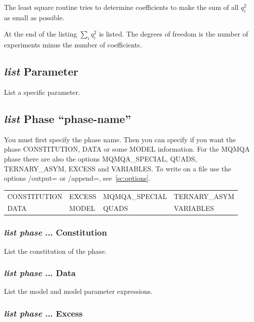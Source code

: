 \documentclass[11pt]{article}
\begin{document}
The least square routine tries to determine coefficients to make the
sum of all $q_i^2$ as small as possible.

At the end of the listing $\sum_i q_i^2$ is listed.  The degrees of
freedom is the number of experiments minus the number of coefficients.

\hypertarget{List parameter}{}
\subsection{{\em list} Parameter}

List a specific parameter.

\hypertarget{List phase}{}
\hypertarget{List what for}{}
\subsection{{\em list} Phase ``phase-name''}

You must first specify the phase name.  Then you can specify if you
want the phase CONSTITUTION, DATA or some MODEL information.  For the
MQMQA phase there are also the options MQMQA\_SPECIAL, QUADS,
TERNARY\_ASYM, EXCESS and VARIABLES.  To write
on a file use the options /output= or /append=, see~\ref{sc:options}.

\bigskip
{\small
\begin{tabular}{llll}
 CONSTITUTION     & EXCESS          & MQMQA\_SPECIAL & TERNARY\_ASYM \\
 DATA             & MODEL           & QUADS          & VARIABLES \\
\end{tabular}
}

\subsubsection{{\em list phase} ... Constitution}

List the constitution of the phase.

\subsubsection{{\em list phase} ... Data}

List the model and model parameter expressions.

\subsubsection{{\em list phase} ... Excess}
\end{document}
